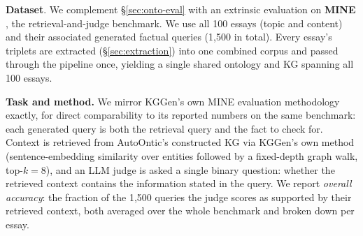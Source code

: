\documentclass[11pt]{article}
\begin{document}
\begin{table}[t]
\caption{Domain/range type-judgment distribution (\%, \S\ref{sec:evaluation}), averaged over matched pairs across all domains of each Text2KGBench subset, across four hierarchy-induction conditions. \emph{Type Match} compares each matched triplet's extracted type against gold; \emph{Constraint Plausibility} compares the relation's mined domain/range constraint instead. \textsc{Not Related} (omitted) is the remainder after Exact, More General, and More Narrow. \emph{Seeded} pins the top-level Wikidata-derived roots; \emph{Depth $\leq$5/$\leq$10} caps hierarchy depth at induction time. Only hierarchy induction differs across conditions -- relation/type canonicalization is held fixed per dataset/backbone.}
\label{tab:text2kgbench-types}
\end{table}


\textbf{Dataset}. We complement \S\ref{sec:onto-eval} with an extrinsic evaluation on
\textbf{MINE} \citep{mo2025kggen}, the retrieval-and-judge benchmark. 
We use all 100 essays (topic and content) and their
associated generated factual queries (1{,}500 in total). Every essay's triplets are extracted
(\S\ref{sec:extraction}) into one combined corpus and passed through the
pipeline once, yielding a single shared ontology and KG spanning all 100
essays.

\textbf{Task and method.} We mirror KGGen's own MINE evaluation methodology exactly, for direct comparability to its reported numbers on the same benchmark: each generated query is both the retrieval query and the fact to check for. Context is retrieved from AutoOntic's constructed KG via KGGen's own
method (sentence-embedding similarity over entities
followed by a fixed-depth graph walk, top-$k=8$), and an LLM judge is asked
a single binary question: whether the retrieved context contains the
information stated in the query. We report \emph{overall accuracy}: the fraction of the
1{,}500 queries the judge scores as supported by their retrieved context,
both averaged over the whole benchmark and broken down per essay.

\end{document}
